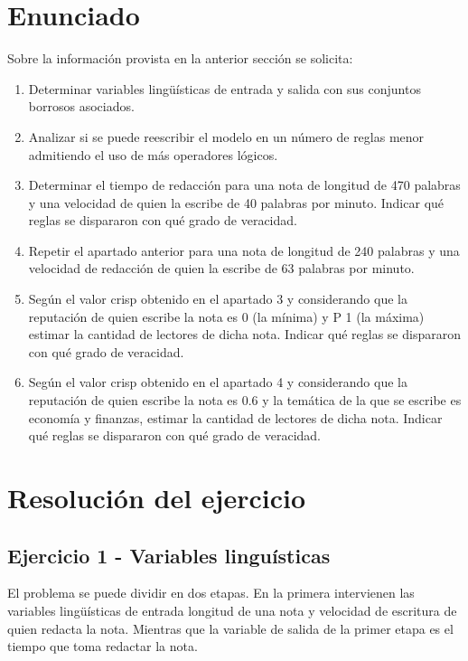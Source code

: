 \documentclass{article}
\begin{document}
\section*{Enunciado}

Sobre la información provista en la anterior sección se solicita:

\begin{enumerate}
	\item Determinar variables lingüísticas de entrada y salida con sus conjuntos borrosos asociados.
	\item Analizar si se puede reescribir el modelo en un número de reglas menor admitiendo el uso de más operadores lógicos.
	\item Determinar el tiempo de redacción para una nota de longitud de 470 palabras y una velocidad de quien la escribe de 40 palabras por minuto. Indicar qué reglas se dispararon con qué grado de veracidad.
	\item Repetir el apartado anterior para una nota de longitud de 240 palabras y una velocidad de redacción de quien la escribe de 63 palabras por minuto.
	\item Según el valor crisp obtenido en el apartado 3 y considerando que la reputación de quien escribe la nota es 0 (la mínima) y P 1 (la máxima) estimar la cantidad de lectores de dicha nota. Indicar qué reglas se dispararon con qué grado de veracidad.
	\item Según el valor crisp obtenido en el apartado 4 y considerando que la reputación de quien escribe la nota es 0.6 y la temática de la que se escribe es economía y finanzas, estimar la cantidad de lectores de dicha nota. Indicar qué reglas se dispararon con qué grado de veracidad.
\end{enumerate}

\pagebreak
\section*{Resolución del ejercicio}

\subsection*{Ejercicio 1 - Variables linguísticas}
El problema se puede dividir en dos etapas. En la primera intervienen las variables lingüísticas de entrada longitud de una nota y velocidad de escritura de quien redacta la nota. Mientras que la variable de salida de la primer etapa es el tiempo que toma redactar la nota.
\end{document}
